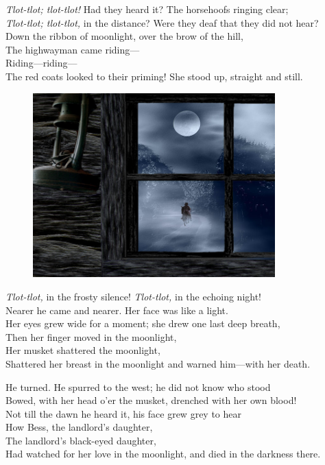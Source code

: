 \documentclass[oneside,12pt,english]{book}
\begin{document}
\textit{Tlot-tlot; tlot-tlot!} Had they heard it? The horsehoofs ringing
clear;\\
\textit{Tlot-tlot; tlot-tlot,} in the distance? Were they deaf that they did not
hear?\\
Down the ribbon of moonlight, over the brow of the hill,\\
The highwayman came riding---\\
Riding---riding---\\
The red coats looked to their priming! She stood up, straight and still.

\begin{figure}[H]
\centering
\includegraphics[height=2.8in]{fig-05.jpg}
\end{figure}

\textit{Tlot-tlot,} in the frosty silence! \textit{Tlot-tlot,} in the echoing 
night!\\
Nearer he came and nearer. Her face was like a light.\\
Her eyes grew wide for a moment; she drew one last deep breath,\\
Then her finger moved in the moonlight,\\
Her musket shattered the moonlight,\\
Shattered her breast in the moonlight and warned him---with her death.


He turned. He spurred to the west; he did not know who stood\\
Bowed, with her head o’er the musket, drenched with her own blood!\\
Not till the dawn he heard it, his face grew grey to hear\\
How Bess, the landlord’s daughter,\\
The landlord’s black-eyed daughter,\\
Had watched for her love in the moonlight, and died in the darkness there.
\end{document}
